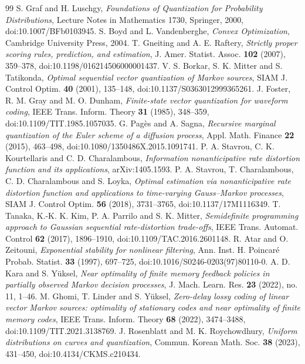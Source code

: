 \begin{thebibliography}{99}
 S. Graf and H. Luschgy, \emph{Foundations of Quantization for Probability Distributions}, Lecture Notes in Mathematics 1730, Springer, 2000, doi:10.1007/BFb0103945.
 S. Boyd and L. Vandenberghe, \emph{Convex Optimization}, Cambridge University Press, 2004.
 T. Gneiting and A. E. Raftery, \emph{Strictly proper scoring rules, prediction, and estimation}, J. Amer. Statist. Assoc. \textbf{102} (2007), 359--378, doi:10.1198/016214506000001437.
 V. S. Borkar, S. K. Mitter and S. Tatikonda, \emph{Optimal sequential vector quantization of Markov sources}, SIAM J. Control Optim. \textbf{40} (2001), 135--148, doi:10.1137/S0363012999365261.
 J. Foster, R. M. Gray and M. O. Dunham, \emph{Finite-state vector quantization for waveform coding}, IEEE Trans. Inform. Theory \textbf{31} (1985), 348--359, doi:10.1109/TIT.1985.1057035.
 G. Pag\`es and A. Sagna, \emph{Recursive marginal quantization of the Euler scheme of a diffusion process}, Appl. Math. Finance \textbf{22} (2015), 463--498, doi:10.1080/1350486X.2015.1091741.
 P. A. Stavrou, C. K. Kourtellaris and C. D. Charalambous, \emph{Information nonanticipative rate distortion function and its applications}, arXiv:1405.1593.
 P. A. Stavrou, T. Charalambous, C. D. Charalambous and S. Loyka, \emph{Optimal estimation via nonanticipative rate distortion function and applications to time-varying Gauss--Markov processes}, SIAM J. Control Optim. \textbf{56} (2018), 3731--3765, doi:10.1137/17M1116349.
 T. Tanaka, K.-K. K. Kim, P. A. Parrilo and S. K. Mitter, \emph{Semidefinite programming approach to Gaussian sequential rate-distortion trade-offs}, IEEE Trans. Automat. Control \textbf{62} (2017), 1896--1910, doi:10.1109/TAC.2016.2601148.
 R. Atar and O. Zeitouni, \emph{Exponential stability for nonlinear filtering}, Ann. Inst. H. Poincar\'e Probab. Statist. \textbf{33} (1997), 697--725, doi:10.1016/S0246-0203(97)80110-0.
 A. D. Kara and S. Y\"uksel, \emph{Near optimality of finite memory feedback policies in partially observed Markov decision processes}, J. Mach. Learn. Res. \textbf{23} (2022), no. 11, 1--46.
 M. Ghomi, T. Linder and S. Y\"uksel, \emph{Zero-delay lossy coding of linear vector Markov sources: optimality of stationary codes and near optimality of finite memory codes}, IEEE Trans. Inform. Theory \textbf{68} (2022), 3474--3488, doi:10.1109/TIT.2021.3138769.
 J. Rosenblatt and M. K. Roychowdhury, \emph{Uniform distributions on curves and quantization}, Commun. Korean Math. Soc. \textbf{38} (2023), 431--450, doi:10.4134/CKMS.c210434.
\end{thebibliography}
